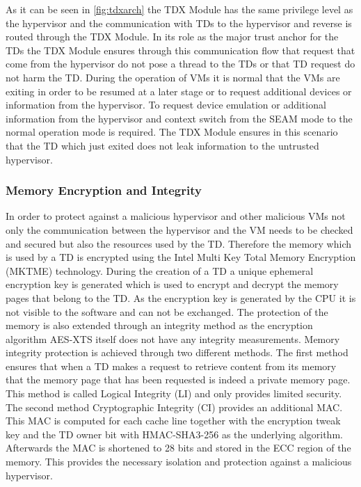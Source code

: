 \documentclass[sigplan,screen,nonacm]{acmart}
\begin{document}
As it can be seen in \cref{fig:tdxarch} the TDX Module has the same privilege level as the hypervisor and the communication with TDs to the hypervisor and reverse is routed through the TDX Module.
In its role as the major trust anchor for the TDs the TDX Module ensures through this communication flow that request that come from the hypervisor do not pose a thread to the TDs or that TD request do not harm the TD.
During the operation of VMs it is normal that the VMs are exiting in order to be resumed at a later stage or to request additional devices or information from the hypervisor.
To request device emulation or additional information from the hypervisor and context switch from the SEAM mode to the normal operation mode is required.
The TDX Module ensures in this scenario that the TD which just exited does not leak information to the untrusted hypervisor.

\subsubsection{Memory Encryption and Integrity}

In order to protect against a malicious hypervisor and other malicious VMs not only the communication between the hypervisor and the VM needs to be checked and secured but also the resources used by the TD.
Therefore the memory which is used by a TD is encrypted using the Intel Multi Key Total Memory Encryption (MKTME) technology.
During the creation of a TD a unique ephemeral encryption key is generated which is used to encrypt and decrypt the memory pages that belong to the TD.
As the encryption key is generated by the CPU it is not visible to the software and can not be exchanged\cite{Intel-MKTME}.
The protection of the memory is also extended through an integrity method as the encryption algorithm AES-XTS itself does not have any integrity measurements.
Memory integrity protection is achieved through two different methods.
The first method ensures that when a TD makes a request to retrieve content from its memory that the memory page that has been requested is indeed a private memory page.
This method is called Logical Integrity (LI) and only provides limited security\cite[p. 120]{Intel-TDX-Module-Specs}.
The second method Cryptographic Integrity (CI) provides an additional MAC.
This MAC is computed for each cache line together with the encryption tweak key and the TD owner bit with HMAC-SHA3-256 as the underlying algorithm\cite[p. 3]{Intel-TDX-Whitepaper}.
Afterwards the MAC is shortened to 28 bits and stored in the ECC region of the memory.
This provides the necessary isolation and protection against a malicious hypervisor.
\end{document}
